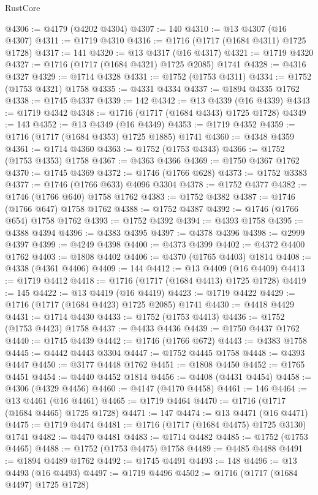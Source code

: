 \begin{lexlean}{RustCore}
\begin{coremodule}
@4306 := @4179 (@4202 @4304)
@4307 := 140
@4310 := @13 @4307 (@16 @4307)
@4311 := @1719 @4310
@4316 := @1716 (@1717 (@1684 @4311) @1725 @1728)
@4317 := 141
@4320 := @13 @4317 (@16 @4317)
@4321 := @1719 @4320
@4327 := @1716 (@1717 (@1684 @4321) @1725 @2085) @1741
@4328 := @4316 @4327
@4329 := @1714 @4328
@4331 := @1752 (@1753 @4311)
@4334 := @1752 (@1753 @4321) @1758
@4335 := @4331 @4334
@4337 := @1894 @4335 @1762
@4338 := @1745 @4337
@4339 := 142
@4342 := @13 @4339 (@16 @4339)
@4343 := @1719 @4342
@4348 := @1716 (@1717 (@1684 @4343) @1725 @1728)
@4349 := 143
@4352 := @13 @4349 (@16 @4349)
@4353 := @1719 @4352
@4359 := @1716 (@1717 (@1684 @4353) @1725 @1885) @1741
@4360 := @4348 @4359
@4361 := @1714 @4360
@4363 := @1752 (@1753 @4343)
@4366 := @1752 (@1753 @4353) @1758
@4367 := @4363 @4366
@4369 := @1750 @4367 @1762
@4370 := @1745 @4369
@4372 := @1746 (@1766 @628)
@4373 := @1752 @3383
@4377 := @1746 (@1766 @633) @4096 @3304
@4378 := @1752 @4377
@4382 := @1746 (@1766 @640) @1758 @1762
@4383 := @1752 @4382
@4387 := @1746 (@1766 @647) @1758 @1762
@4388 := @1752 @4387
@4392 := @1746 (@1766 @654) @1758 @1762
@4393 := @1752 @4392
@4394 := @4393 @1758
@4395 := @4388 @4394
@4396 := @4383 @4395
@4397 := @4378 @4396
@4398 := @2999 @4397
@4399 := @4249 @4398
@4400 := @4373 @4399
@4402 := @4372 @4400 @1762
@4403 := @1808 @4402
@4406 := @4370 (@1765 @4403) @1814
@4408 := @4338 (@4361 @4406)
@4409 := 144
@4412 := @13 @4409 (@16 @4409)
@4413 := @1719 @4412
@4418 := @1716 (@1717 (@1684 @4413) @1725 @1728)
@4419 := 145
@4422 := @13 @4419 (@16 @4419)
@4423 := @1719 @4422
@4429 := @1716 (@1717 (@1684 @4423) @1725 @2085) @1741
@4430 := @4418 @4429
@4431 := @1714 @4430
@4433 := @1752 (@1753 @4413)
@4436 := @1752 (@1753 @4423) @1758
@4437 := @4433 @4436
@4439 := @1750 @4437 @1762
@4440 := @1745 @4439
@4442 := @1746 (@1766 @672)
@4443 := @4383 @1758
@4445 := @4442 @4443 @3304
@4447 := @1752 @4445 @1758
@4448 := @4393 @4447
@4450 := @3177 @4448 @1762
@4451 := @1808 @4450
@4452 := @1765 @4451
@4454 := @4440 @4452 @1814
@4456 := @4408 (@4431 @4454)
@4458 := @4306 (@4329 @4456)
@4460 := @4147 (@4170 @4458)
@4461 := 146
@4464 := @13 @4461 (@16 @4461)
@4465 := @1719 @4464
@4470 := @1716 (@1717 (@1684 @4465) @1725 @1728)
@4471 := 147
@4474 := @13 @4471 (@16 @4471)
@4475 := @1719 @4474
@4481 := @1716 (@1717 (@1684 @4475) @1725 @3130) @1741
@4482 := @4470 @4481
@4483 := @1714 @4482
@4485 := @1752 (@1753 @4465)
@4488 := @1752 (@1753 @4475) @1758
@4489 := @4485 @4488
@4491 := @1894 @4489 @1762
@4492 := @1745 @4491
@4493 := 148
@4496 := @13 @4493 (@16 @4493)
@4497 := @1719 @4496
@4502 := @1716 (@1717 (@1684 @4497) @1725 @1728)

\end{coremodule}
\end{lexlean}
